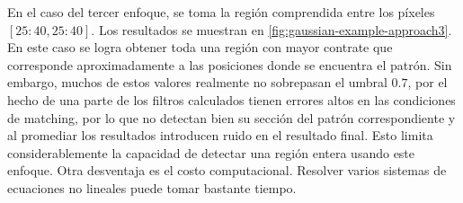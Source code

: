 En el caso del tercer enfoque, se toma la región comprendida entre los píxeles $[25:40,25:40]$. Los resultados se muestran
en \ref{fig:gaussian-example-approach3}. En este caso se logra obtener toda una región con mayor contrate que corresponde aproximadamente
a las posiciones donde se encuentra el patrón. Sin embargo, muchos de estos valores realmente no sobrepasan el umbral $0.7$,
por el hecho de una parte de los filtros calculados tienen errores altos en las condiciones de matching, por lo que
no detectan bien su sección del patrón correspondiente y al promediar los resultados introducen ruido en el resultado final.
Esto limita considerablemente la capacidad de detectar una región entera usando este enfoque. Otra desventaja es el costo
computacional. Resolver varios sistemas de ecuaciones no lineales puede tomar bastante tiempo.

